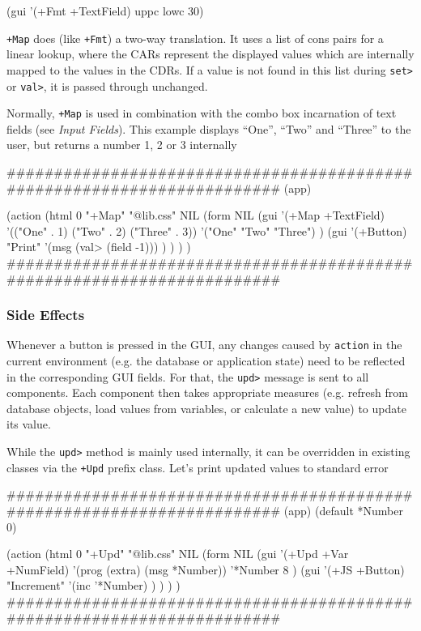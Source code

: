 \begin{wideverbatim}
(gui '(+Fmt +TextField) uppc lowc 30)
\end{wideverbatim}

\texttt{+Map} does (like \texttt{+Fmt}) a two-way translation. It uses a list of cons
pairs for a linear lookup, where the CARs represent the displayed values
which are internally mapped to the values in the CDRs. If a value is not
found in this list during \texttt{set>} or \texttt{val>}, it is passed through
unchanged.

Normally, \texttt{+Map} is used in combination with the combo box incarnation
of text fields (see \emph{Input Fields}). This example
displays ``One'', ``Two'' and ``Three'' to the user, but returns a number 1, 2
or 3 internally


\begin{wideverbatim}
########################################################################
(app)

(action
   (html 0 "+Map" "@lib.css" NIL
      (form NIL
         (gui '(+Map +TextField)
            '(("One" . 1) ("Two" . 2) ("Three" . 3))
            '("One" "Two" "Three") )
         (gui '(+Button) "Print"
            '(msg (val> (field -1))) ) ) ) )
########################################################################
\end{wideverbatim}


\subsubsection{ Side Effects}
\label{sec:appl-devel-side-effects}%

Whenever a button is pressed in the GUI, any changes caused by \texttt{action}
in the current environment (e.g. the database or application state) need
to be reflected in the corresponding GUI fields. For that, the \texttt{upd>}
message is sent to all components. Each component then takes appropriate
measures (e.g. refresh from database objects, load values from
variables, or calculate a new value) to update its value.

While the \texttt{upd>} method is mainly used internally, it can be overridden
in existing classes via the \texttt{+Upd} prefix class. Let's print updated
values to standard error


\begin{wideverbatim}
########################################################################
(app)
(default *Number 0)

(action
   (html 0 "+Upd" "@lib.css" NIL
      (form NIL
         (gui '(+Upd +Var +NumField)
            '(prog (extra) (msg *Number))
            '*Number 8 )
         (gui '(+JS +Button) "Increment"
            '(inc '*Number) ) ) ) )
########################################################################
\end{wideverbatim}

